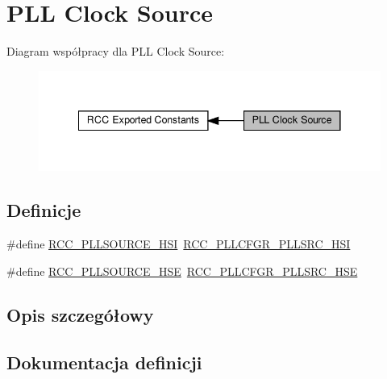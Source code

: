 \hypertarget{group___r_c_c___p_l_l___clock___source}{}\section{P\+LL Clock Source}
\label{group___r_c_c___p_l_l___clock___source}
Diagram współpracy dla P\+LL Clock Source\+:\nopagebreak
\begin{figure}[H]
\begin{center}
\leavevmode
\includegraphics[width=341pt]{group___r_c_c___p_l_l___clock___source}
\end{center}
\end{figure}
\subsection*{Definicje}
\begin{DoxyCompactItemize}
\item 
\#define \hyperlink{group___r_c_c___p_l_l___clock___source_ga0e07703f1ccb3d60f8a47a2dc631c218}{R\+C\+C\+\_\+\+P\+L\+L\+S\+O\+U\+R\+C\+E\+\_\+\+H\+SI}~\hyperlink{group___peripheral___registers___bits___definition_gadf688c4f038f29247cc0280dbdda24a7}{R\+C\+C\+\_\+\+P\+L\+L\+C\+F\+G\+R\+\_\+\+P\+L\+L\+S\+R\+C\+\_\+\+H\+SI}
\item 
\#define \hyperlink{group___r_c_c___p_l_l___clock___source_ga197cea7fe5c2db26fe7fcdb0f99dd4d7}{R\+C\+C\+\_\+\+P\+L\+L\+S\+O\+U\+R\+C\+E\+\_\+\+H\+SE}~\hyperlink{group___peripheral___registers___bits___definition_gae3a86c3918526efe2258ecbb34b91587}{R\+C\+C\+\_\+\+P\+L\+L\+C\+F\+G\+R\+\_\+\+P\+L\+L\+S\+R\+C\+\_\+\+H\+SE}
\end{DoxyCompactItemize}


\subsection{Opis szczegółowy}


\subsection{Dokumentacja definicji}
\mbox{\label{group___r_c_c___p_l_l___clock___source_ga197cea7fe5c2db26fe7fcdb0f99dd4d7}} 
